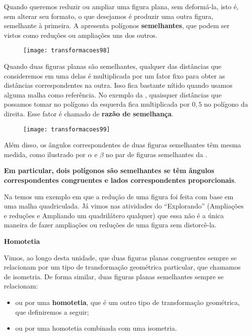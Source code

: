 Quando queremos reduzir ou ampliar uma figura plana, sem deformá-la, isto é, sem alterar seu formato, o que desejamos é produzir uma outra figura, semelhante à primeira. A  apresenta polígonos \textbf{semelhantes}, que podem ser vistos como reduções ou ampliações uns dos outros.

\begin{figure}[H]
\centering

\texttt{[image: transformacoes98]}
\caption{}
\label{transformacoes98}
\end{figure}
 
Quando duas figuras planas são semelhantes, qualquer das distâncias que consideremos em uma delas é multiplicada por um fator fixo para obter as distâncias correspondentes na outra. Isso fica bastante nítido quando usamos alguma malha como referência. No exemplo da , quaisquer distâncias que possamos tomar no polígono da esquerda fica multiplicada por $0{,}5$ no polígono da direita. Esse fator é chamado de \textbf{razão de semelhança}.

\begin{figure}[H]
\centering

\texttt{[image: transformacoes99]}
\caption{}
\label{transformacoes99}
\end{figure}
 
Além disso, os ângulos correspondentes de duas figuras semelhantes têm mesma medida, como ilustrado por $\alpha$ e $\beta$ no par de figuras semelhantes da .

\textbf{Em particular, dois polígonos são semelhantes se têm ângulos correspondentes congruentes e lados correspondentes proporcionais}. 

Na  temos um exemplo em que a redução de uma figura foi feita com base em uma malha quadriculada. Já vimos nas atividades do “Explorando” (Ampliações e reduções e Ampliando um quadrilátero qualquer) que essa não é a única maneira de fazer ampliações ou reduções de uma figura sem distorcê-la. 

\textbf{Homotetia}

Vimos, ao longo desta unidade, que duas figuras planas congruentes sempre se relacionam por um tipo de transformação geométrica particular, que chamamos de isometria. De forma similar, duas figuras planas semelhantes sempre se relacionam: 

\begin{itemize}
\item ou por uma \textbf{homotetia}, que é um outro tipo de transformação geométrica, que definiremos a seguir;
\item ou por uma homotetia combinada com uma isometria. 
\end{itemize}

